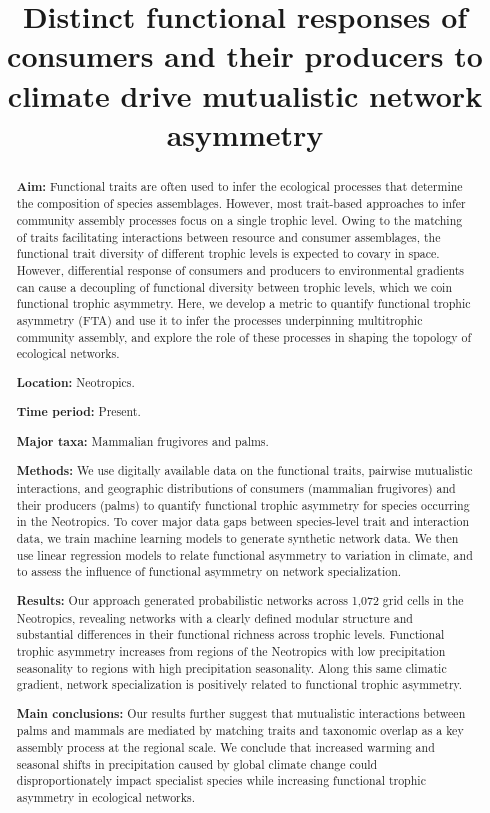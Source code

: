 \documentclass[
]{agujournal2019}
\begin{document}
\title{Distinct functional responses of consumers and their producers to
climate drive mutualistic network asymmetry}



\begin{abstract}
\textbf{Aim:} Functional traits are often used to infer the ecological
processes that determine the composition of species assemblages.
However, most trait-based approaches to infer community assembly
processes focus on a single trophic level. Owing to the matching of
traits facilitating interactions between resource and consumer
assemblages, the functional trait diversity of different trophic levels
is expected to covary in space. However, differential response of
consumers and producers to environmental gradients can cause a
decoupling of functional diversity between trophic levels, which we coin
functional trophic asymmetry. Here, we develop a metric to quantify
functional trophic asymmetry (FTA) and use it to infer the processes
underpinning multitrophic community assembly, and explore the role of
these processes in shaping the topology of ecological networks.

\textbf{Location:} Neotropics.

\textbf{Time period:} Present.

\textbf{Major taxa:} Mammalian frugivores and palms.

\textbf{Methods:} We use digitally available data on the functional
traits, pairwise mutualistic interactions, and geographic distributions
of consumers (mammalian frugivores) and their producers (palms) to
quantify functional trophic asymmetry for species occurring in the
Neotropics. To cover major data gaps between species-level trait and
interaction data, we train machine learning models to generate synthetic
network data. We then use linear regression models to relate functional
asymmetry to variation in climate, and to assess the influence of
functional asymmetry on network specialization.

\textbf{Results:} Our approach generated probabilistic networks across
1,072 grid cells in the Neotropics, revealing networks with a clearly
defined modular structure and substantial differences in their
functional richness across trophic levels. Functional trophic asymmetry
increases from regions of the Neotropics with low precipitation
seasonality to regions with high precipitation seasonality. Along this
same climatic gradient, network specialization is positively related to
functional trophic asymmetry.

\textbf{Main conclusions:} Our results further suggest that mutualistic
interactions between palms and mammals are mediated by matching traits
and taxonomic overlap as a key assembly process at the regional scale.
We conclude that increased warming and seasonal shifts in precipitation
caused by global climate change could disproportionately impact
specialist species while increasing functional trophic asymmetry in
ecological networks.
\end{abstract}
\end{document}
